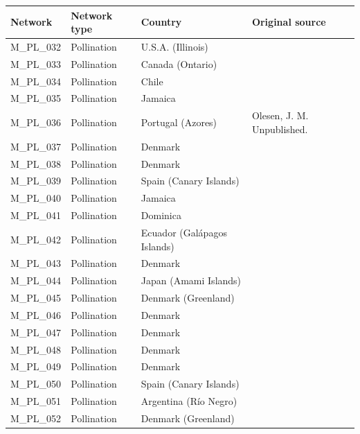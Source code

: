 \documentclass[12pt]{article}
\begin{document}
\begin{spacing}{1.5}
    \begin{table}[h!]
    \begin{center}
    \begin{tabular}{|l l l m{6cm} |}
    \hline
    Network & Network type & Country & Original source \\
    \hline
    M\_PL\_032  & Pollination & U.S.A. (Illinois) & \citet{Schemske1978}  \\
    M\_PL\_033  & Pollination & Canada (Ontario) & \citet{Small1976} \\
    M\_PL\_034  & Pollination & Chile & \citet{SmithRamirez2005}  \\
    M\_PL\_035  & Pollination & Jamaica & \citet{Percival1974}  \\
    M\_PL\_036  & Pollination & Portugal (Azores) & Olesen, J. M. Unpublished.  \\
    M\_PL\_037  & Pollination & Denmark & \citet{Montero2005} \\
    M\_PL\_038  & Pollination & Denmark & \citet{Montero2005} \\
    M\_PL\_039  & Pollination & Spain (Canary Islands) & \citet{Stald2003} \\
    M\_PL\_040  & Pollination & Jamaica & \citet{Ingversen2006} \\
    M\_PL\_041  & Pollination & Dominica & \citet{Ingversen2006} \\
    M\_PL\_042  & Pollination & Ecuador (Gal\'{a}pagos Islands) & \citet{Philipp2006} \\
    M\_PL\_043  & Pollination & Denmark & \citet{Montero2005} \\
    M\_PL\_044  & Pollination & Japan (Amami Islands) & \citet{Kato2000}  \\
    M\_PL\_045  & Pollination & Denmark (Greenland) & \citet{Lundgren2005}  \\
    M\_PL\_046  & Pollination & Denmark & \citet{Bundgaard2003} \\
    M\_PL\_047  & Pollination & Denmark & \citet{Dupont2009a}  \\
    M\_PL\_048  & Pollination & Denmark & \citet{Dupont2009a}  \\
    M\_PL\_049  & Pollination & Denmark & \citet{Bek2006}  \\
    M\_PL\_050  & Pollination & Spain (Canary Islands) & \citet{Stald2003} \\
    M\_PL\_051  & Pollination & Argentina (R\'{i}o Negro) & \citet{Vazquez2002} \\
    M\_PL\_052  & Pollination & Denmark (Greenland) & \citet{Witt1998}  \\

\end{tabular}
\end{center}
\end{table}
\end{spacing}
\end{document}
